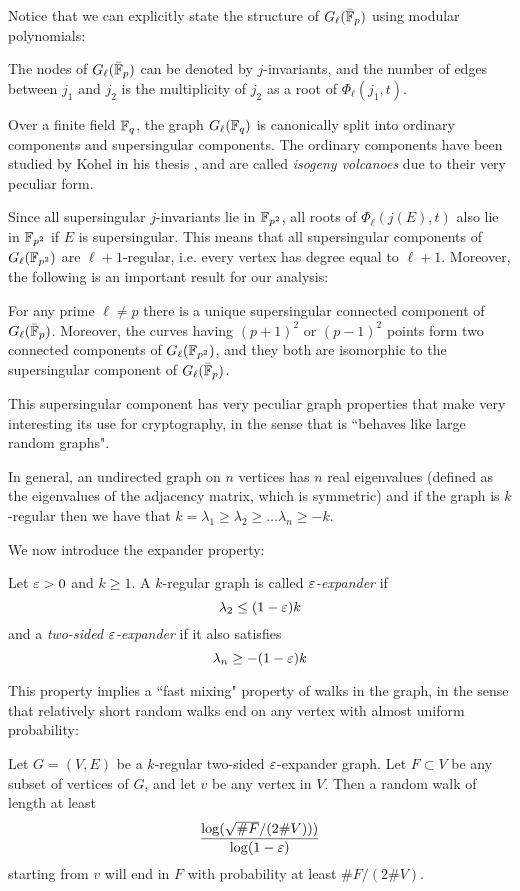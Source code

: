 Notice that we can explicitly state the structure of $G_\ell(\bar{\mathbb{F}}_p)$ using modular polynomials:
\begin{proposition}
    The nodes of $G_\ell(\bar {\mathbb{F}}_p)$ can be denoted by $j$-invariants, and the number of edges between $j_1$ and $j_2$ is the multiplicity of $j_2$ as a root of $\Phi_\ell(j_1,t)$.
\end{proposition}

Over a finite field $\mathbb{F}_q$, the graph $G_\ell(\mathbb{F}_q)$ is canonically split into ordinary components and supersingular components. The ordinary components have been studied by Kohel in his thesis \cite{Kohel_thesis}, and are called \emph{isogeny volcanoes} due to their very peculiar form.

Since all supersingular $j$-invariants lie in $\mathbb{F}_{p^2}$, all roots of $\Phi_\ell(j(E),t)$ also lie in $\mathbb{F}_{p^2}$ if $E$ is supersingular. This means that all supersingular components of $G_\ell(\mathbb{F}_{p^2})$ are $\ell+1$-regular, i.e. every vertex has degree equal to $\ell+1$. Moreover, the following is an important result for our analysis:
\begin{theorem}
    For any prime $\ell\neq p$ there is a unique supersingular connected component of $G_\ell(\bar{\mathbb{F}}_p)$. Moreover, the curves having $(p+1)^2$ or $(p-1)^2$ points form two connected components of $G_\ell(\mathbb{F}_{p^2})$, and they both are isomorphic to the supersingular component of $G_\ell(\bar{\mathbb{F}}_p)$.
\end{theorem}

This supersingular component has very peculiar graph properties that make very interesting its use for cryptography, in the sense that is ``behaves like large random graphs".

In general, an undirected graph on $n$ vertices has $n$ real eigenvalues (defined as the eigenvalues of the adjacency matrix, which is symmetric) and if the graph is $k$-regular then we have that $k=\lambda_1\ge\lambda_2\ge\dots \lambda_n\ge -k$.

We now introduce the expander property:
\begin{definition}
    Let $\varepsilon>0$ and $k\ge1$. A $k$-regular graph is called \emph{$\varepsilon$-expander} if
    $$\lambda_2\le(1-\varepsilon)k$$
    and a \emph{two-sided $\varepsilon$-expander} if it also satisfies 
    $$\lambda_n\ge-(1-\varepsilon)k$$
\end{definition}

This property implies a ``fast mixing" property of walks in the graph, in the sense that relatively short random walks end on any vertex with almost uniform probability:
\begin{proposition}
    Let $G=(V,E)$ be a $k$-regular two-sided $\varepsilon$-expander graph. Let $F\subset V$ be any subset of vertices of $G$, and let $v$ be any vertex in $V$. Then a random walk of length at least $$\frac{\log(\sqrt{\# F}/(2\# V)))}{\log(1-\varepsilon)}$$ starting from $v$ will end in $F$ with probability at least $\# F / (2\# V)$.
\end{proposition}

